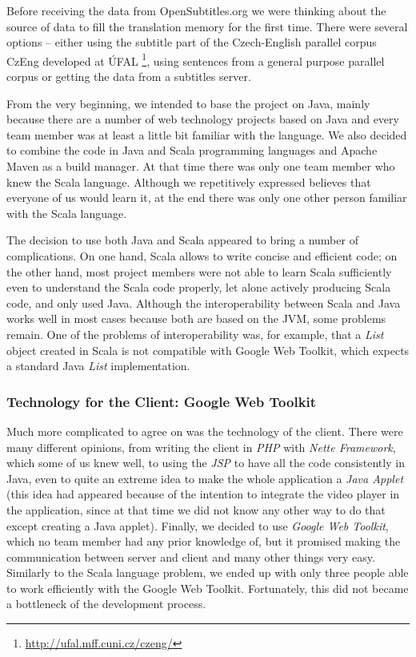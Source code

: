 Before receiving the data from OpenSubtitles.org we were thinking about the source of data to fill the translation memory for the first time. There were several options -- either using the subtitle part of the Czech-English parallel corpus CzEng developed at ÚFAL \footnote{\url{http://ufal.mff.cuni.cz/czeng/}}, using sentences from a general purpose parallel corpus or getting the data from a subtitles server.

From the very beginning, we intended to base the project on Java, mainly because there are a number of web technology projects based on Java and every team member was at least a little bit familiar with the language. We also decided to combine the code in Java and Scala programming languages and Apache Maven as a build manager. At that time there was only one team member who knew the Scala language. Although we repetitively expressed believes that everyone of us would learn it, at the end there was only one other person familiar with the Scala language.

The decision to use both Java and Scala appeared to bring a number of complications. On one hand, Scala allows to write concise and efficient code; on the other hand, most project members were not able to learn Scala sufficiently even to understand the Scala code properly, let alone actively producing Scala code, and only used Java.
Although the interoperability between Scala and Java works well in most cases because both are based on the JVM, some problems remain. One of the problems of interoperability was, for example, that a \emph{List} object created in Scala is not compatible with Google Web Toolkit, which expects a standard Java \emph{List} implementation.

\subsubsection{Technology for the Client: Google Web Toolkit}
\label{subsubsec:implementation:gwt}

Much more complicated to agree on was the technology of the client. There were many different opinions, from writing the client in {\it PHP} with {\it Nette Framework}, which some of us knew well, to using the {\it JSP} to have all the code consistently in Java, even to quite an extreme idea to make the whole application a {\it Java Applet} (this idea had appeared because of the intention to integrate the video player in the application, since at that time we did not know any other way to do that except creating a Java applet). Finally, we decided to use {\it Google Web Toolkit}, which no team member had any prior knowledge of, but it promised making the communication between server and client and many other things very easy. Similarly to the Scala language problem, we ended up with only three people able to work efficiently with the Google Web Toolkit. Fortunately, this did not became a bottleneck of the development process.

